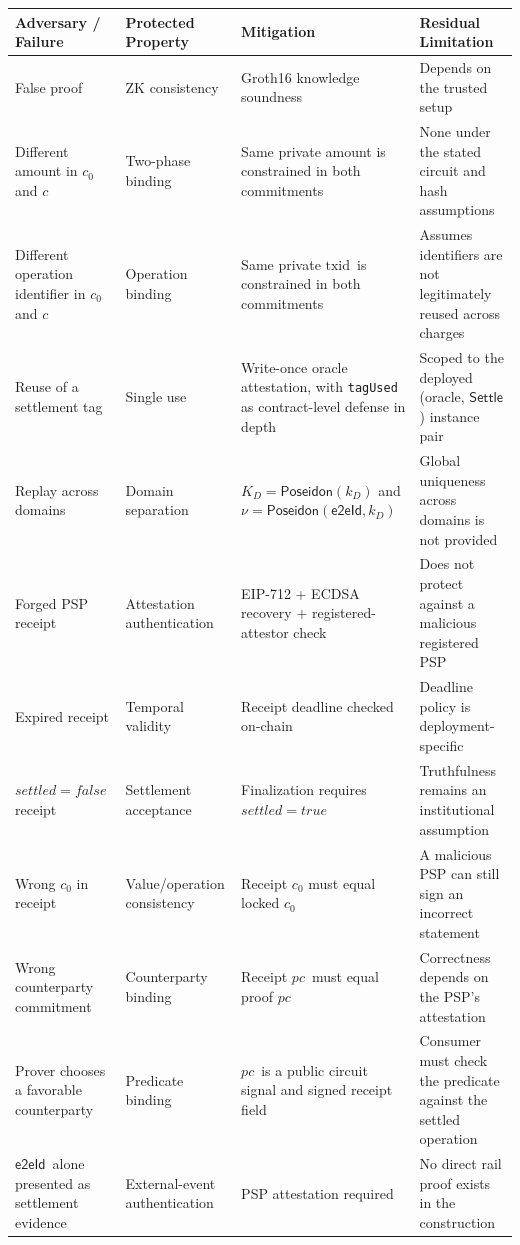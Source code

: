 \documentclass[10pt,twocolumn]{article}
\newcommand{\Poseidon}{\ensuremath{\mathsf{Poseidon}}}
\newcommand{\eeid}{\ensuremath{\mathsf{e2eId}}}
\newcommand{\code}[1]{\texttt{#1}}
\newcommand{\txid}{\ensuremath{\text{txid}}}
\newcommand{\pc}{\ensuremath{\mathit{pc}}}
\newcommand{\Settle}{\ensuremath{\mathsf{Settle}}}
\begin{document}
\begin{table}[t]
\centering
\scriptsize
\setlength{\tabcolsep}{2pt}
\begin{tabular}{@{}p{3.05cm}p{2.15cm}p{4.5cm}p{4.5cm}@{}}
\toprule
Adversary / Failure & Protected Property & Mitigation & Residual Limitation \\
\midrule
False proof & ZK consistency & Groth16 knowledge soundness & Depends on the trusted setup \\
Different amount in $c_0$ and $c$ & Two-phase binding & Same private amount is constrained in both commitments & None under the stated circuit and hash assumptions \\
Different operation identifier in $c_0$ and $c$ & Operation binding & Same private \txid\ is constrained in both commitments & Assumes identifiers are not legitimately reused across charges \\
Reuse of a settlement tag & Single use & Write-once oracle attestation, with \code{tagUsed} as contract-level defense in depth & Scoped to the deployed (oracle, \Settle) instance pair \\
Replay across domains & Domain separation & $K_D=\Poseidon(k_D)$ and $\nu=\Poseidon(\eeid,k_D)$ & Global uniqueness across domains is not provided \\
Forged PSP receipt & Attestation authentication & EIP-712 + ECDSA recovery + registered-attestor check & Does not protect against a malicious registered PSP \\
Expired receipt & Temporal validity & Receipt deadline checked on-chain & Deadline policy is deployment-specific \\
$\mathit{settled}=\mathit{false}$ receipt & Settlement acceptance & Finalization requires $\mathit{settled}=\mathit{true}$ & Truthfulness remains an institutional assumption \\
Wrong $c_0$ in receipt & Value/operation consistency & Receipt $c_0$ must equal locked $c_0$ & A malicious PSP can still sign an incorrect statement \\
Wrong counterparty commitment & Counterparty binding & Receipt \pc\ must equal proof \pc\ & Correctness depends on the PSP's attestation \\
Prover chooses a favorable counterparty & Predicate binding & \pc\ is a public circuit signal and signed receipt field & Consumer must check the predicate against the settled operation \\
\eeid\ alone presented as settlement evidence & External-event authentication & PSP attestation required & No direct rail proof exists in the construction \\

\end{tabular}
\end{table}
\end{document}
